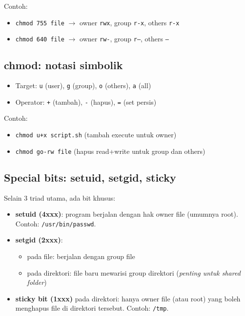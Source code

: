 Contoh:
\begin{itemize}
    \item \texttt{chmod 755 file} $\rightarrow$ owner \texttt{rwx}, group \texttt{r-x}, others \texttt{r-x}
    \item \texttt{chmod 640 file} $\rightarrow$ owner \texttt{rw-}, group \texttt{r--}, others \texttt{---}
\end{itemize}

\subsection*{chmod: notasi simbolik}
\begin{itemize}
    \item Target: \texttt{u} (user), \texttt{g} (group), \texttt{o} (others), \texttt{a} (all)
    \item Operator: \texttt{+} (tambah), \texttt{-} (hapus), \texttt{=} (set persis)
\end{itemize}

Contoh:
\begin{itemize}
    \item \texttt{chmod u+x script.sh} (tambah execute untuk owner)
    \item \texttt{chmod go-rw file} (hapus read+write untuk group dan others)
\end{itemize}

\subsection*{Special bits: setuid, setgid, sticky}
Selain 3 triad utama, ada bit khusus:
\begin{itemize}
    \item \textbf{setuid (4xxx)}: program berjalan dengan hak owner file (umumnya root). Contoh: \texttt{/usr/bin/passwd}.
    \item \textbf{setgid (2xxx)}:
    \begin{itemize}
        \item pada file: berjalan dengan group file
        \item pada direktori: file baru mewarisi group direktori (\textit{penting untuk shared folder})
    \end{itemize}
    \item \textbf{sticky bit (1xxx)} pada direktori: hanya owner file (atau root) yang boleh menghapus file di direktori tersebut.
          Contoh: \texttt{/tmp}.
\end{itemize}

